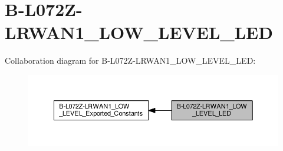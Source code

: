 \hypertarget{group__B-L072Z-LRWAN1__LOW__LEVEL__LED}{}\section{B-\/\+L072\+Z-\/\+L\+R\+W\+A\+N1\+\_\+\+L\+O\+W\+\_\+\+L\+E\+V\+E\+L\+\_\+\+L\+ED}
\label{group__B-L072Z-LRWAN1__LOW__LEVEL__LED}
Collaboration diagram for B-\/\+L072\+Z-\/\+L\+R\+W\+A\+N1\+\_\+\+L\+O\+W\+\_\+\+L\+E\+V\+E\+L\+\_\+\+L\+ED\+:
\nopagebreak
\begin{figure}[H]
\begin{center}
\leavevmode
\includegraphics[width=350pt]{group__B-L072Z-LRWAN1__LOW__LEVEL__LED}
\end{center}
\end{figure}
